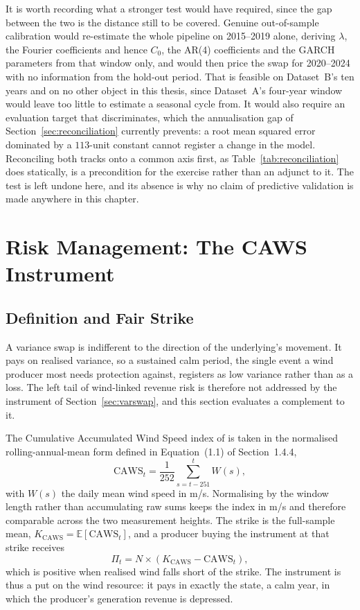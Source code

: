 \documentclass[11pt, a4paper, twoside]{article}
\begin{document}
It is worth recording what a stronger test would have required, since the gap between the two is the distance still to be covered. Genuine out-of-sample calibration would re-estimate the whole pipeline on 2015--2019 alone, deriving $\lambda$, the Fourier coefficients and hence $C_0$, the AR(4) coefficients and the GARCH parameters from that window only, and would then price the swap for 2020--2024 with no information from the hold-out period. That is feasible on Dataset~B's ten years and on no other object in this thesis, since Dataset~A's four-year window would leave too little to estimate a seasonal cycle from. It would also require an evaluation target that discriminates, which the annualisation gap of Section~\ref{sec:reconciliation} currently prevents: a root mean squared error dominated by a $113$-unit constant cannot register a change in the model. Reconciling both tracks onto a common axis first, as Table~\ref{tab:reconciliation} does statically, is a precondition for the exercise rather than an adjunct to it. The test is left undone here, and its absence is why no claim of predictive validation is made anywhere in this chapter.

\section{Risk Management: The CAWS Instrument}
\label{sec:caws}

\subsection{Definition and Fair Strike}
\label{sec:caws-def}

A variance swap is indifferent to the direction of the underlying's movement. It pays on realised variance, so a sustained calm period, the single event a wind producer most needs protection against, registers as low variance rather than as a loss. The left tail of wind-linked revenue risk is therefore not addressed by the instrument of Section~\ref{sec:varswap}, and this section evaluates a complement to it.

The Cumulative Accumulated Wind Speed index of \citet{AlexandridisZapranis2013} is taken in the normalised rolling-annual-mean form defined in Equation~(1.1) of Section~1.4.4,
\begin{equation}
\mathrm{CAWS}_t = \frac{1}{252}\sum_{s=t-251}^{t} W(s),
\end{equation}
with $W(s)$ the daily mean wind speed in m/s. Normalising by the window length rather than accumulating raw sums keeps the index in m/s and therefore comparable across the two measurement heights. The strike is the full-sample mean, $K_{\mathrm{CAWS}} = \mathbb{E}[\mathrm{CAWS}_t]$, and a producer buying the instrument at that strike receives
\begin{equation}
\Pi_t = N \times (K_{\mathrm{CAWS}} - \mathrm{CAWS}_t),
\end{equation}
which is positive when realised wind falls short of the strike. The instrument is thus a put on the wind resource: it pays in exactly the state, a calm year, in which the producer's generation revenue is depressed.
\end{document}
